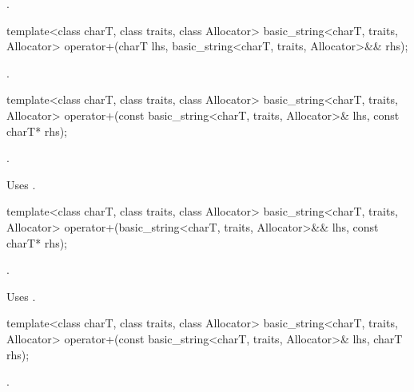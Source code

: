 \begin{itemdescr}
\pnum
\returns
{}.
\end{itemdescr}

%
\begin{itemdecl}
template<class charT, class traits, class Allocator>
  basic_string<charT, traits, Allocator>
    operator+(charT lhs, basic_string<charT, traits, Allocator>&& rhs);
\end{itemdecl}

\begin{itemdescr}
\pnum
\returns
{}.
\end{itemdescr}

%
\begin{itemdecl}
template<class charT, class traits, class Allocator>
  basic_string<charT, traits, Allocator>
    operator+(const basic_string<charT, traits, Allocator>& lhs, const charT* rhs);
\end{itemdecl}

\begin{itemdescr}
\pnum
\returns
{}.

\pnum
\remarks
Uses
.
\end{itemdescr}

%
\begin{itemdecl}
template<class charT, class traits, class Allocator>
  basic_string<charT, traits, Allocator>
    operator+(basic_string<charT, traits, Allocator>&& lhs, const charT* rhs);
\end{itemdecl}

\begin{itemdescr}
\pnum
\returns
{}.

\pnum
\remarks
Uses
.
\end{itemdescr}

%
\begin{itemdecl}
template<class charT, class traits, class Allocator>
  basic_string<charT, traits, Allocator>
    operator+(const basic_string<charT, traits, Allocator>& lhs, charT rhs);
\end{itemdecl}

\begin{itemdescr}
\pnum
\returns
{}.
\end{itemdescr}


